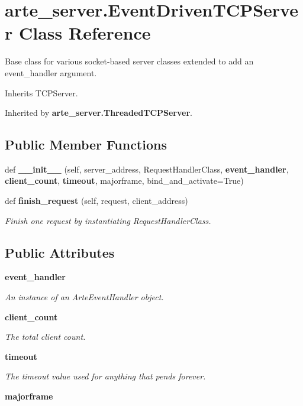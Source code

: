\section{arte\+\_\+server.\+Event\+Driven\+T\+C\+P\+Server Class Reference}
\label{classarte__server_1_1_event_driven_t_c_p_server}


Base class for various socket-\/based server classes extended to add an event\+\_\+handler argument.  




Inherits T\+C\+P\+Server.



Inherited by {\bf arte\+\_\+server.\+Threaded\+T\+C\+P\+Server}.

\subsection*{Public Member Functions}
\begin{DoxyCompactItemize}
\item 
def {\bfseries \+\_\+\+\_\+init\+\_\+\+\_\+} (self, server\+\_\+address, Request\+Handler\+Class, {\bf event\+\_\+handler}, {\bf client\+\_\+count}, {\bf timeout}, majorframe, bind\+\_\+and\+\_\+activate=True)\label{classarte__server_1_1_event_driven_t_c_p_server_a1b67d692e00b8a7a412c6583999be742}

\item 
def {\bf finish\+\_\+request} (self, request, client\+\_\+address)
\begin{DoxyCompactList}\small\item\em Finish one request by instantiating Request\+Handler\+Class. \end{DoxyCompactList}\end{DoxyCompactItemize}
\subsection*{Public Attributes}
\begin{DoxyCompactItemize}
\item 
{\bf event\+\_\+handler}
\begin{DoxyCompactList}\small\item\em An instance of an Arte\+Event\+Handler object. \end{DoxyCompactList}\item 
{\bf client\+\_\+count}
\begin{DoxyCompactList}\small\item\em The total client count. \end{DoxyCompactList}\item 
{\bf timeout}
\begin{DoxyCompactList}\small\item\em The timeout value used for anything that pends forever. \end{DoxyCompactList}\item 
{\bfseries majorframe}\label{classarte__server_1_1_event_driven_t_c_p_server_ac00a7ee310cfc5b7c50f547ab90c9608}

\end{DoxyCompactItemize}


